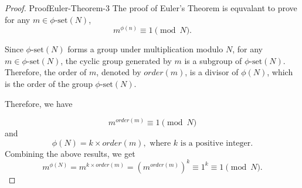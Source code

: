 \documentclass[10pt,a4paper]{amsart}
\begin{document}
\begin{proof}{Proof}{}{Euler-Theorem-3}
The proof of Euler's Theorem is equvalant to prove for any \(m \in \phi\text{-set}(N)\),%
\begin{equation*}
m^{\phi(n)} \equiv 1 \pmod N\text{.}
\end{equation*}
%
\par
Since \(\phi\text{-set}(N)\) forms a group under multiplication modulo \(N\), for any \(m \in \phi\text{-set}(N)\), the cyclic group generated by \(m\) is a subgroup of \(\phi\text{-set}(N)\). Therefore, the order of \(m\), denoted by \(order(m)\), is a divisor of \(\phi(N)\), which is the order of the group \(\phi\text{-set}(N)\).%
\par
Therefore, we have%
\par
%
\begin{equation*}
m^{order(m)} \equiv 1 \pmod N
\end{equation*}
and%
\begin{equation*}
\phi(N) = k \times order(m), \text{ where } k \text{ is a positive integer.}
\end{equation*}
Combining the above results, we get%
\begin{equation*}
m^{\phi(N)} = m^{k \times order(m)} = (m^{order(m)})^k \equiv 1^k \equiv 1 \pmod N\text{.}
\end{equation*}
%
\end{proof}
\end{document}
